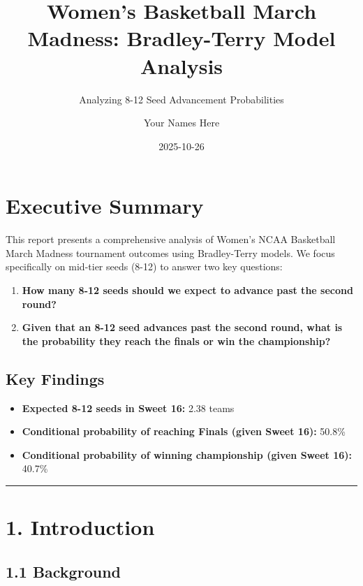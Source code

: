\documentclass[
]{article}
\title{Women's Basketball March Madness: Bradley-Terry Model Analysis}
\subtitle{Analyzing 8-12 Seed Advancement Probabilities}
\author{Your Names Here}
\date{2025-10-26}
\providecommand{\tightlist}{%
  \setlength{\itemsep}{0pt}\setlength{\parskip}{0pt}}
\begin{document}
\maketitle

{
\setcounter{tocdepth}{3}
\tableofcontents
}
\section{Executive Summary}\label{executive-summary}

This report presents a comprehensive analysis of Women's NCAA Basketball
March Madness tournament outcomes using Bradley-Terry models. We focus
specifically on mid-tier seeds (8-12) to answer two key questions:

\begin{enumerate}
\def\labelenumi{\arabic{enumi}.}
\tightlist
\item
  \textbf{How many 8-12 seeds should we expect to advance past the
  second round?}
\item
  \textbf{Given that an 8-12 seed advances past the second round, what
  is the probability they reach the finals or win the championship?}
\end{enumerate}

\subsection{Key Findings}\label{key-findings}

\begin{itemize}
\tightlist
\item
  \textbf{Expected 8-12 seeds in Sweet 16:} 2.38 teams
\item
  \textbf{Conditional probability of reaching Finals (given Sweet 16):}
  50.8\%
\item
  \textbf{Conditional probability of winning championship (given Sweet
  16):} 40.7\%
\end{itemize}

\begin{center}\rule{0.5\linewidth}{0.5pt}\end{center}

\section{1. Introduction}\label{introduction}

\subsection{1.1 Background}\label{background}
\end{document}
